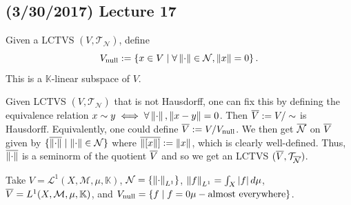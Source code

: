 \documentclass[11pt,leqno,oneside]{amsbook}
\numberwithin{thm}{section}
\newcommand{\M}{\mathcal{M}} %
\newcommand{\Top}{\mathcal{T}} %
\newcommand{\cL}{\mathcal{L}}
\newcommand{\cN}{\mathcal{N}}
\newcommand{\norms}{\cN}
\begin{document}
\subsection*{(3/30/2017) Lecture 17}
\begin{defn}
  Given a LCTVS \((V,\Top_\norms)\), define \[
    V_{\text{null}} := \left\{ x \in V \st \forall \norm \in \norms,
      \norm[x] = 0 \right\}.
  \]
  This is a \(\mathbb{K}\)-linear subspace of \(V\).
\end{defn}
\begin{rmk}
  Given LCTVS \((V,\Top_\norms)\)  that is not Hausdorff, one can fix
  this by defining the equivalence relation \(x \sim y \iff \forall
  \norm, \norm[x-y] = 0\). Then \(\ov{V} := V/\sim\) is
  Hausdorff. Equivalently, one could define \(\ov{V} :=
  V/V_{\text{null}}\). We then get \(\ov{\norms}\) on \(\ov{V}\) given
  by \(\{\ov{\norm} \st \norm \in \norms\}\) where \(\ov{\norm[[x]]}
  := \norm[x]\), which is clearly well-defined. Thus, \(\ov{\norm}\)
  is a seminorm of the quotient \(\ov{V}\) and so we get an LCTVS
  \((\ov{V}, \Top_{\ov{\norms}})\).
\end{rmk}
\begin{example}
  Take \(V = \cL^1(X,\M,\mu,\mathbb{K})\), \(\norms =
  \{\norm_{L^1}\}\), \(\norm[f]_{L^1} = \int_X |f|\d\mu\), \(\ov{V} =
  L^1(X,\M,\mu,\mathbb{K})\), and \(V_\text{null} = \{f \st f=0
  \mu-\text{almost everywhere}\}\).
\end{example}
\end{document}
